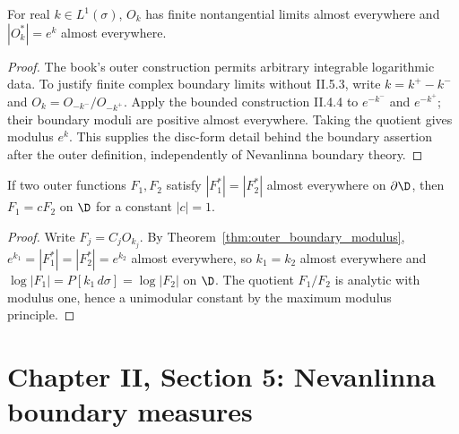 \begin{theorem}
  \label{thm:outer_boundary_modulus}
  \leanok
  For real $k\in L^1(\sigma)$, $O_k$ has finite nontangential limits
  almost everywhere and $|O_k^*|=e^k$ almost everywhere.
  \begin{proof}
    \notready
    The book's outer construction permits arbitrary integrable logarithmic
    data. To justify finite complex boundary limits without II.5.3, write
    $k=k^+-k^-$ and $O_k=O_{-k^-}/O_{-k^+}$. Apply the bounded construction
    II.4.4 to $e^{-k^-}$ and $e^{-k^+}$; their boundary moduli are positive
    almost everywhere. Taking the quotient gives modulus $e^k$.
    This supplies the disc-form detail behind the boundary assertion after
    the outer definition, independently of Nevanlinna boundary theory.
  \end{proof}
\end{theorem}

\begin{theorem}
  \label{thm:outer_uniqueness}
  \leanok
  \mainline
  If two outer functions $F_1,F_2$ satisfy $|F_1^*|=|F_2^*|$ almost
  everywhere on $\partial\D$, then $F_1=cF_2$ on $\D$ for a constant $|c|=1$.
  \begin{proof}
    \notready
    Write $F_j=C_jO_{k_j}$. By Theorem~\ref{thm:outer_boundary_modulus},
    $e^{k_1}=|F_1^*|=|F_2^*|=e^{k_2}$ almost everywhere, so $k_1=k_2$
    almost everywhere and $\log|F_1|=P[k_1\,d\sigma]=\log|F_2|$ on $\D$. The
    quotient $F_1/F_2$ is analytic with modulus one, hence a unimodular
    constant by the maximum modulus principle.
  \end{proof}
\end{theorem}

\section{Chapter II, Section 5: Nevanlinna boundary measures}

